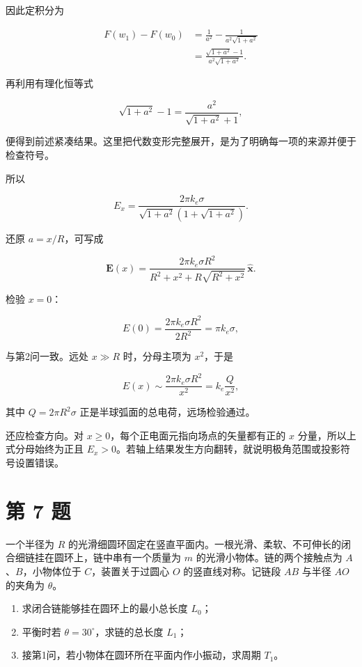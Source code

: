 \documentclass[12pt,a4paper,UTF8]{ctexart}
\newcommand{\tightlist}{\setlength{\itemsep}{0pt}\setlength{\parskip}{0pt}}
\begin{document}
因此定积分为

\[
\begin{aligned}
F(w_1)-F(w_0)
&=\frac{1}{a^2}
-\frac{1}{a^2\sqrt{1+a^2}}\\
&=\frac{\sqrt{1+a^2}-1}
{a^2\sqrt{1+a^2}}.
\end{aligned}
\]

再利用有理化恒等式

\[
\sqrt{1+a^2}-1
=\frac{a^2}{\sqrt{1+a^2}+1},
\]

便得到前述紧凑结果。这里把代数变形完整展开，是为了明确每一项的来源并便于检查符号。

所以

\[
E_x
=\frac{2\pi k_e\sigma}
{\sqrt{1+a^2}\left(1+\sqrt{1+a^2}\right)}.
\]

还原 \(a=x/R\)，可写成

\[
\boxed{
\bm E(x)=
\frac{2\pi k_e\sigma R^2}
{R^2+x^2+R\sqrt{R^2+x^2}}
\,\hat{\bm x}
}.
\]

检验 \(x=0\)：

\[
E(0)=\frac{2\pi k_e\sigma R^2}{2R^2}=\pi k_e\sigma,
\]

与第2问一致。远处 \(x\gg R\) 时，分母主项为 \(x^2\)，于是

\[
E(x)\sim\frac{2\pi k_e\sigma R^2}{x^2}
=k_e\frac{Q}{x^2},
\]

其中 \(Q=2\pi R^2\sigma\) 正是半球弧面的总电荷，远场检验通过。

还应检查方向。对 \(x\ge0\)，每个正电面元指向场点的矢量都有正的 \(x\)
分量，所以上式分母始终为正且
\(E_x>0\)。若轴上结果发生方向翻转，就说明极角范围或投影符号设置错误。

\newpage

\section{第 7 题}\label{ux7b2c-7-ux9898}

一个半径为 \(R\)
的光滑细圆环固定在竖直平面内。一根光滑、柔软、不可伸长的闭合细链挂在圆环上，链中串有一个质量为
\(m\) 的光滑小物体。链的两个接触点为 \(A\)、\(B\)，小物体位于
\(C\)，装置关于过圆心 \(O\) 的竖直线对称。记链段 \(AB\) 与半径 \(AO\)
的夹角为 \(\theta\)。

\begin{enumerate}
\def\labelenumi{\arabic{enumi}.}
\tightlist
\item
  求闭合链能够挂在圆环上的最小总长度 \(L_0\)；
\item
  平衡时若 \(\theta=30^\circ\)，求链的总长度 \(L_1\)；
\item
  接第1问，若小物体在圆环所在平面内作小振动，求周期 \(T_1\)。
\end{enumerate}
\end{document}
